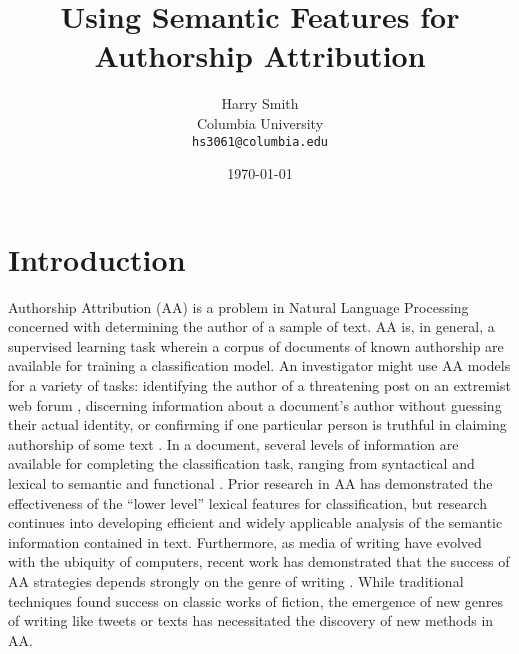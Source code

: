 \documentclass[11pt,a4paper]{article}
\title{Using Semantic Features for Authorship Attribution}
\author{Harry Smith \\
  Columbia University \\
  {\tt hs3061@columbia.edu}\\}
\date{\today}
\begin{document}
\maketitle

\section{Introduction}

Authorship Attribution (AA) is a problem in Natural Language Processing concerned with determining the author of a sample of text. AA is, in general, a supervised learning task wherein a corpus of documents of known authorship are available for training a classification model. An investigator might use AA models for a variety of tasks: identifying the author of a threatening post on an extremist web forum \cite{Stamatatos2018}, discerning information about a document's author without guessing their actual identity, or confirming if one particular person is truthful in claiming authorship of some text \cite{Stamatatos2009}. In a document, several levels of information are available for completing the classification task, ranging from syntactical and lexical to semantic and functional \cite{Argamon2007}. Prior research in AA has demonstrated the effectiveness of the ``lower level'' lexical features for classification, but research continues into developing efficient and widely applicable analysis of the semantic information contained in text. Furthermore, as media of writing have evolved with the ubiquity of computers, recent work has demonstrated that the success of AA strategies depends strongly on the genre of writing \cite{Stamatatos2018}. While traditional techniques found success on classic works of fiction, the emergence of new genres of writing like tweets or texts has necessitated the discovery of new methods in AA.
\end{document}
